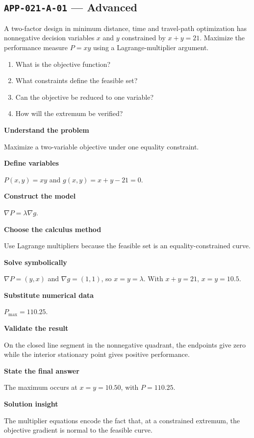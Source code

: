 \documentclass[11pt]{book}
\newcommand{\pid}[1]{\texttt{#1}}
\begin{document}
\subsection*{\pid{APP-021-A-01} — Advanced}
\begin{problembox}
A two-factor design in minimum distance, time and travel-path optimization has nonnegative decision variables $x$ and $y$ constrained by $x+y=21$. Maximize the performance measure $P=xy$ using a Lagrange-multiplier argument.
\end{problembox}
\begin{promptbox}\begin{enumerate}
\item What is the objective function?
\item What constraints define the feasible set?
\item Can the objective be reduced to one variable?
\item How will the extremum be verified?
\end{enumerate}\end{promptbox}
\begin{solutionbox}
\textbf{Understand the problem}\par Maximize a two-variable objective under one equality constraint.\par\medskip
\textbf{Define variables}\par $P(x,y)=xy$ and $g(x,y)=x+y-21=0$.\par\medskip
\textbf{Construct the model}\par $\nabla P=\lambda\nabla g$.\par\medskip
\textbf{Choose the calculus method}\par Use Lagrange multipliers because the feasible set is an equality-constrained curve.\par\medskip
\textbf{Solve symbolically}\par $\nabla P=(y,x)$ and $\nabla g=(1,1)$, so $x=y=\lambda$. With $x+y=21$, $x=y=10.5$.\par\medskip
\textbf{Substitute numerical data}\par $P_{\max}=110.25$.\par\medskip
\textbf{Validate the result}\par On the closed line segment in the nonnegative quadrant, the endpoints give zero while the interior stationary point gives positive performance.\par\medskip
\textbf{State the final answer}\par The maximum occurs at $x=y=10.50$, with $P=110.25$.\par\medskip
\textbf{Solution insight}\par The multiplier equations encode the fact that, at a constrained extremum, the objective gradient is normal to the feasible curve.\par\medskip
\end{solutionbox}
\end{document}
